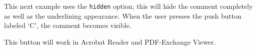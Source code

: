\documentclass{article}
\begin{document}
\smallskip
This next example uses the \texttt{hidden} option; this will hide the comment completely
as well as the underlining appearance. When the user presses the push button labeled `C',
the comment becomes visible.

    This button will work in
  \textsf{Acrobat Reader} and \textsf{PDF-Exchange Viewer}.
\end{document}
